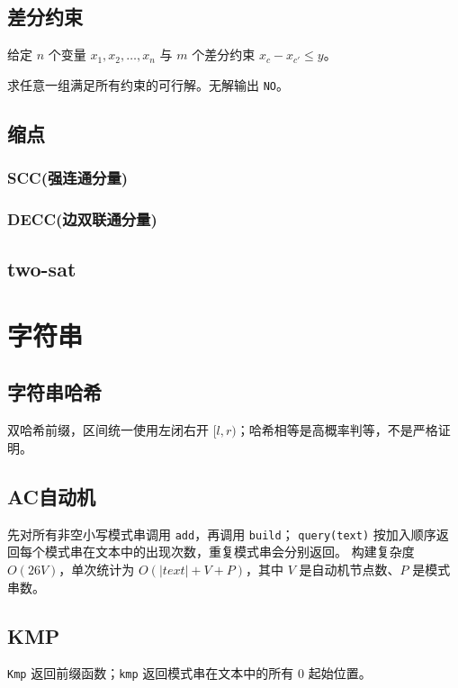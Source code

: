 \documentclass[11pt,a4paper,twocolumn]{ctexart}  %
\begin{document}
\subsection{差分约束}

给定 $n$ 个变量 $x_1, x_2, \dots, x_n$ 与 $m$ 个差分约束 $x_c - x_{c'} \leq y$。

求任意一组满足所有约束的可行解。无解输出 \texttt{NO}。


\subsection{缩点}
\subsubsection{SCC(强连通分量)}

\subsubsection{DECC(边双联通分量)}

\subsection{two-sat}

\clearpage
\section{字符串}
\subsection{字符串哈希}
双哈希前缀，区间统一使用左闭右开 $[l,r)$；哈希相等是高概率判等，不是严格证明。


\subsection{AC自动机}
先对所有非空小写模式串调用 \texttt{add}，再调用 \texttt{build}；
\texttt{query(text)} 按加入顺序返回每个模式串在文本中的出现次数，重复模式串会分别返回。
构建复杂度 $O(26V)$，单次统计为 $O(|text|+V+P)$，其中 $V$ 是自动机节点数、$P$ 是模式串数。


\subsection{KMP}
\texttt{Kmp} 返回前缀函数；\texttt{kmp} 返回模式串在文本中的所有 $0$ 起始位置。

\end{document}
